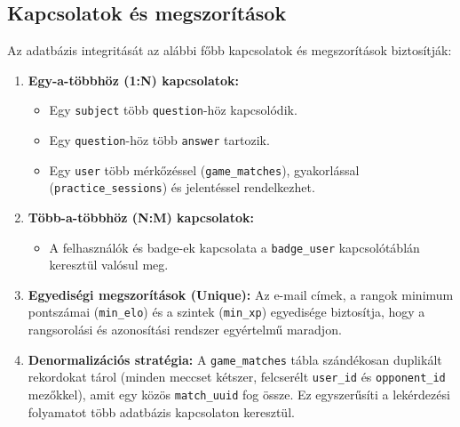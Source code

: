 \subsection{Kapcsolatok és megszorítások}
Az adatbázis integritását az alábbi főbb kapcsolatok és megszorítások biztosítják:

\begin{enumerate}
    \item \textbf{Egy-a-többhöz (1:N) kapcsolatok:}
    \begin{itemize}
        \item Egy \texttt{subject} több \texttt{question}-höz kapcsolódik.
        \item Egy \texttt{question}-höz több \texttt{answer} tartozik.
        \item Egy \texttt{user} több mérkőzéssel (\texttt{game\_matches}), gyakorlással (\texttt{practice\_sessions}) és jelentéssel rendelkezhet.
    \end{itemize}
    
    \item \textbf{Több-a-többhöz (N:M) kapcsolatok:}
    \begin{itemize}
        \item A felhasználók és badge-ek kapcsolata a \texttt{badge\_user} kapcsolótáblán keresztül valósul meg.
    \end{itemize}

    \item \textbf{Egyediségi megszorítások (Unique):}
    Az e-mail címek, a rangok minimum pontszámai (\texttt{min\_elo}) és a szintek (\texttt{min\_xp}) egyedisége biztosítja, hogy a rangsorolási és azonosítási rendszer egyértelmű maradjon.
    
    \item \textbf{Denormalizációs stratégia:}
    A \texttt{game\_matches} tábla szándékosan duplikált rekordokat tárol (minden meccset kétszer, felcserélt \texttt{user\_id} és \texttt{opponent\_id} mezőkkel), amit egy közös \texttt{match\_uuid} fog össze. Ez egyszerűsíti a lekérdezési folyamatot több adatbázis kapcsolaton keresztül.
\end{enumerate}